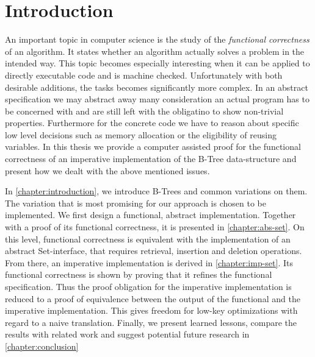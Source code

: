 

\chapter{Introduction}\label{chapter:introduction}

An important topic in computer science is the study of the
\textit{functional correctness} of an algorithm.
It states whether an algorithm actually solves a problem
in the intended way.
This topic becomes especially interesting when it can be applied
to directly executable code and is machine checked.
Unfortunately with both desirable additions, the tasks becomes
significantly more complex.
In an abstract specification we may abstract away many consideration
an actual program has to be concerned with and are still
left with the obligatino to show non-trivial properties.
Furthermore for the concrete code we have to reason about specific low level
decisions such as memory allocation or
the eligibility of reusing variables.
In this thesis we provide a computer assisted proof for the functional
correctness of an imperative implementation of the B-Tree data-structure
and present how we dealt with the above mentioned issues.

In \autoref{chapter:introduction}, we introduce B-Trees and common variations
on them.
The variation that is most promising for our approach is chosen
to be implemented.
We first design a functional, abstract implementation.
Together with a proof of its functional correctness,
it is presented in \autoref{chapter:abs-set}.
On this level, functional correctness is equivalent with the
implementation of an abstract Set-interface,
that requires retrieval, insertion and deletion operations.
From there, an imperative implementation is derived in \autoref{chapter:imp-set}.
Its functional correctness is shown by proving that it refines the functional specification.
Thus the proof obligation for the imperative implementation
is reduced to a proof of equivalence between the output of the
functional and the imperative implementation.
This gives freedom for low-key optimizations with regard to a naive translation.
Finally, we present learned lessons, compare the results with related work and suggest potential future
research in \autoref{chapter:conclusion}


